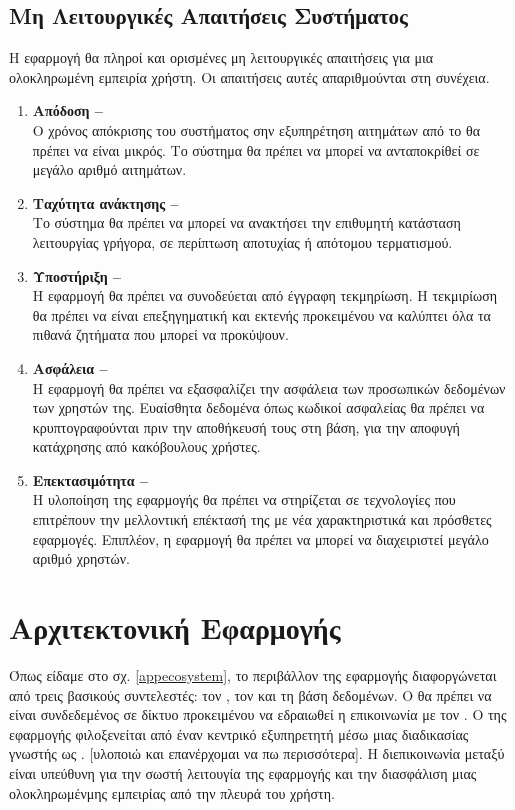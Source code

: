 \subsection{Μη Λειτουργικές Απαιτήσεις Συστήματος}
Η εφαρμογή θα πληροί και ορισμένες μη λειτουργικές απαιτήσεις για μια ολοκληρωμένη εμπειρία χρήστη. Οι απαιτήσεις αυτές απαριθμούνται στη συνέχεια.

\begin{enumerate}
    \item \textbf{Απόδοση -- } \\
    Ο χρόνος απόκρισης του συστήματος σην εξυπηρέτηση αιτημάτων από το  θα πρέπει να είναι μικρός. Το σύστημα θα πρέπει να μπορεί να ανταποκρίθεί σε μεγάλο αριθμό αιτημάτων.
    \item \textbf{Ταχύτητα ανάκτησης -- } \\
    Το σύστημα θα πρέπει να μπορεί να ανακτήσει την επιθυμητή κατάσταση λειτουργίας γρήγορα, σε περίπτωση αποτυχίας ή απότομου τερματισμού.
    \item \textbf{Υποστήριξη -- } \\
    Η εφαρμογή θα πρέπει να συνοδεύεται από έγγραφη τεκμηρίωση. Η τεκμιρίωση θα πρέπει να είναι επεξηγηματική και εκτενής προκειμένου να καλύπτει όλα τα πιθανά ζητήματα που μπορεί να προκύψουν.
    \item \textbf{Ασφάλεια -- } \\
    Η εφαρμογή θα πρέπει να εξασφαλίζει την ασφάλεια των προσωπικών δεδομένων των χρηστών της. Ευαίσθητα δεδομένα όπως κωδικοί ασφαλείας θα πρέπει να κρυπτογραφούνται πριν την αποθήκευσή τους στη βάση, για την αποφυγή κατάχρησης από κακόβουλους χρήστες.
    \item \textbf{Επεκτασιμότητα -- } \\
    Η υλοποίηση της εφαρμογής θα πρέπει να στηρίζεται σε τεχνολογίες που επιτρέπουν την μελλοντική επέκτασή της με νέα χαρακτηριστικά και πρόσθετες εφαρμογές. Επιπλέον, η εφαρμογή θα πρέπει να μπορεί να διαχειριστεί μεγάλο αριθμό χρηστών.
\end{enumerate}



\section{Αρχιτεκτονική Εφαρμογής}
Όπως είδαμε στο  σχ. \ref{appecosystem}, το περιβάλλον της εφαρμογής διαφοργώνεται από τρεις βασικούς συντελεστές: τον , τον  και τη βάση δεδομένων. Ο  θα πρέπει να είναι συνδεδεμένος σε δίκτυο προκειμένου να εδραιωθεί η επικοινωνία με τον . Ο  της εφαρμογής φιλοξενείται από έναν κεντρικό εξυπηρετητή μέσω μιας διαδικασίας γνωστής ως . [υλοποιώ και επανέρχομαι να πω περισσότερα]. Η διεπικοινωνία μεταξύ  είναι υπεύθυνη για την σωστή λειτουγία της εφαρμογής και την διασφάλιση μιας ολοκληρωμένμης εμπειρίας από την πλευρά του χρήστη. 

